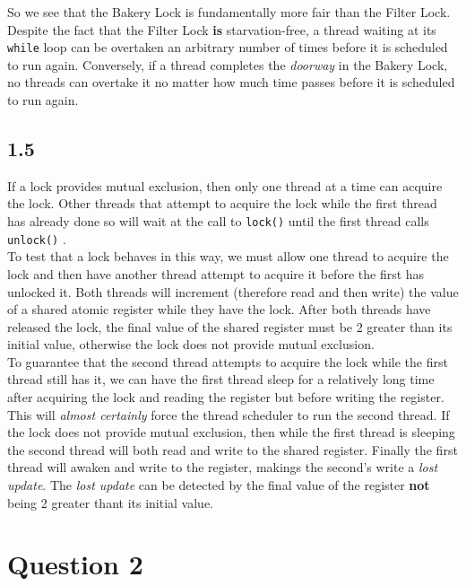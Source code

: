 \documentclass[11pt, letterpaper]{article}
\newcommand{\code}[1] { \texttt{#1} }
\begin{document}
So we see that the Bakery Lock is fundamentally more fair than the Filter Lock. Despite the fact that the Filter Lock \textbf{is} starvation-free, a thread waiting at its \code{while} loop can be overtaken an arbitrary number of times before it is scheduled to run again. Conversely, if a thread completes the \textit{doorway} in the Bakery Lock, no threads can overtake it no matter how much time passes before it is scheduled to run again.

\subsection*{1.5}
\label{sub:1_5}

If a lock provides mutual exclusion, then only one thread at a time can acquire the lock. Other threads that attempt to acquire the lock while the first thread has already done so will wait at the call to \code{lock()} until the first thread calls \code{unlock()}.\\

To test that a lock behaves in this way, we must allow one thread to acquire the lock and then have another thread attempt to acquire it before the first has unlocked it. Both threads will increment (therefore read and then write) the value of a shared atomic register while they have the lock. After both threads have released the lock, the final value of the shared register must be 2 greater than its initial value, otherwise the lock does not provide mutual exclusion.\\

To guarantee that the second thread attempts to acquire the lock while the first thread still has it, we can have the first thread sleep for a relatively long time after acquiring the lock and reading the register but before writing the register. This will \textit{almost certainly} force the thread scheduler to run the second thread. If the lock does not provide mutual exclusion, then while the first thread is sleeping the second thread will both read and write to the shared register. Finally the first thread will awaken and write to the register, makings the second's write a \textit{lost update}. The \textit{lost update} can be detected by the final value of the register \textbf{not} being 2 greater thant its initial value.

\newpage
\section*{Question 2}
\label{sec:question_2}
\end{document}
